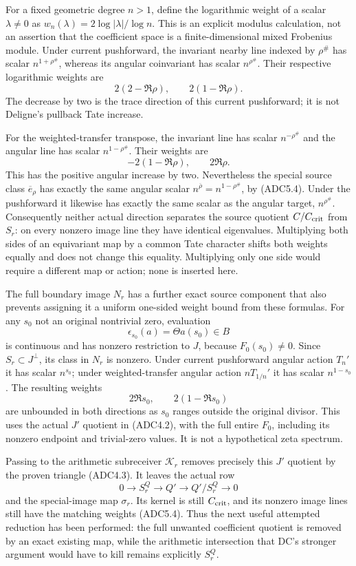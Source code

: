 For a fixed geometric degree \(n>1\), define the logarithmic weight of a
scalar \(\lambda\ne0\) as \(w_n(\lambda)=2\log|\lambda|/\log n\). This
is an explicit modulus calculation, not an assertion that the
coefficient space is a finite-dimensional mixed Frobenius module. Under
current pushforward, the invariant nearby line indexed by \(\rho^\#\)
has scalar \(n^{1+\rho^\#}\), whereas its angular coinvariant has scalar
\(n^{\rho^\#}\). Their respective logarithmic weights are \[
2(2-\Re\rho),\qquad 2(1-\Re\rho).
\tag{ADC7.1}
\] The decrease by two is the trace direction of this current
pushforward; it is not Deligne's pullback Tate increase.

For the weighted-transfer transpose, the invariant line has scalar
\(n^{-\rho^\#}\) and the angular line has scalar \(n^{1-\rho^\#}\).
Their weights are \[
-2(1-\Re\rho),\qquad 2\Re\rho.
\tag{ADC7.2}
\] This has the positive angular increase by two. Nevertheless the
special source class \(\overline e_\rho\) has exactly the same angular
scalar \(n^{\overline\rho}=n^{1-\rho^\#}\), by (ADC5.4). Under the
pushforward it likewise has exactly the same scalar as the angular
target, \(n^{\rho^\#}\). Consequently neither actual direction separates
the source quotient \(C/C_{\rm crit}\) from \(S_r\): on every nonzero
image line they have identical eigenvalues. Multiplying both sides of an
equivariant map by a common Tate character shifts both weights equally
and does not change this equality. Multiplying only one side would
require a different map or action; none is inserted here.

The full boundary image \(N_r\) has a further exact source component
that also prevents assigning it a uniform one-sided weight bound from
these formulas. For any \(s_0\) not an original nontrivial zero,
evaluation \[
\epsilon_{s_0}(a)=\Theta a(s_0)\in B
\tag{ADC7.3}
\] is continuous and has nonzero restriction to \(J\), because
\(F_0(s_0)\ne0\). Since \(S_r\subset J^\perp\), its class in \(N_r\) is
nonzero. Under current pushforward angular action \(T_n'\) it has scalar
\(n^{s_0}\); under weighted-transfer angular action \(nT_{1/n}'\) it has
scalar \(n^{1-s_0}\). The resulting weights \[
2\Re s_0,\qquad 2(1-\Re s_0)
\tag{ADC7.4}
\] are unbounded in both directions as \(s_0\) ranges outside the
original divisor. This uses the actual \(J'\) quotient in (ADC4.2), with
the full entire \(F_0\), including its nonzero endpoint and trivial-zero
values. It is not a hypothetical zeta spectrum.

Passing to the arithmetic subreceiver \(\mathscr K_r\) removes precisely
this \(J'\) quotient by the proven triangle (ADC4.3). It leaves the
actual row \[
0\to S_r^Q\to Q'\to Q'/S_r^Q\to0
\tag{ADC7.5}
\] and the special-image map \(\sigma_r\). Its kernel is still
\(C_{\rm crit}\), and its nonzero image lines still have the matching
weights (ADC5.4). Thus the next useful attempted reduction has been
performed: the full unwanted coefficient quotient is removed by an exact
existing map, while the arithmetic intersection that DC's stronger
argument would have to kill remains explicitly \(S_r^Q\).

